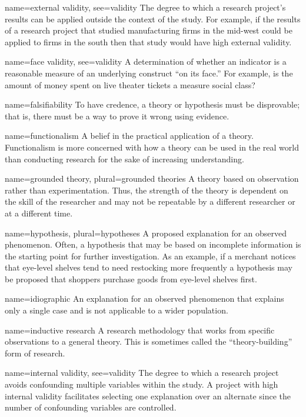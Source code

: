 {name={external validity},
	see={validity}}
{%
	The degree to which a research project's results can be applied outside the context of the study. For example, if the results of a research project that studied manufacturing firms in the mid-west could be applied to firms in the south then that study would have high external validity.
}

{name={face validity},
	see={validity}}
{%
	A determination of whether an indicator is a reasonable measure of an underlying construct ``on its face.'' For example, is the amount of money spent on live theater tickets a measure social class?
}

{name={falsifiability}}
{%
	To have credence, a theory or hypothesis must be disprovable; that is, there must be a way to prove it wrong using evidence.
}

{name={functionalism}}
{%
	A belief in the practical application of a theory. Functionalism is more concerned with how a theory can be used in the real world than conducting	research for the sake of increasing understanding. 
}

{name={grounded theory},
	plural={grounded theories}}
{%
	A theory based on observation rather than experimentation. Thus, the strength of the theory is dependent on the skill of the researcher and may not be repeatable by a different researcher or at a different time.
}

{name={hypothesis},
	plural={hypotheses}}
{%
	A proposed explanation for an observed phenomenon. Often, a hypothesis that may be based on incomplete information is the starting point for further investigation. As an example, if a merchant notices that eye-level shelves tend to need restocking more frequently a hypothesis may be proposed that shoppers purchase goods from eye-level shelves first. 
}

{name={idiographic}}
{%
	An explanation for an observed phenomenon that explains only a single case and is not applicable to a wider population.
}

{name={inductive research}}
{%
	A research methodology that works from specific observations to a general theory. This is sometimes called the ``theory-building'' form of research.
}

{name={internal validity},
	see={validity}}
{%
	The degree to which a research project avoids confounding multiple variables within the study. A project with high internal validity facilitates selecting one explanation over an alternate since the number of confounding variables are controlled.
}

